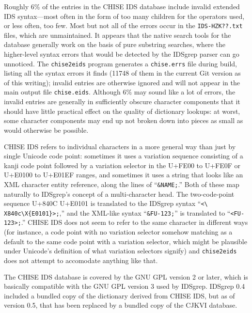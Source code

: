 \documentclass[twocolumn]{report}
\begin{document}
Roughly 6\% of the entries in the CHISE IDS database include invalid
extended IDS syntax---most often in the form of too many children for the
operators used, or less often, too few.  Most but not all of the errors
occur in the \texttt{IDS-HZK??.txt} files, which are unmaintained.  It
appears that the native search tools for the database generally work on the
basis of pure substring searches, where the higher-level syntax errors that
would be detected by the IDSgrep parser can go unnoticed.  The
\texttt{chise2eids} program generates a \texttt{chise.errs} file during
build, listing all the syntax errors it finds (11748 of them in the current
Git version as of this writing); invalid entries are otherwise ignored and
will not appear in the main output file \texttt{chise.eids}.  Although 6\%
may sound like a lot of errors, the invalid entries are generally in
sufficiently obscure character components that it should have little
practical effect on the quality of dictionary lookups: at worst, some
character components may end up not broken down into pieces as small as
would otherwise be possible.

CHISE IDS refers to individual characters in a more general way than just by
single Unicode code point: sometimes it uses a variation sequence consisting
of a kanji code point followed by a variation selector in the U+FE00 to
U+FE0F or U+E0100 to U+E01EF ranges, and sometimes it uses a string that
looks like an XML character entity reference, along the lines of
``\texttt{\&NAME;}.'' Both of these map naturally to IDSgrep's concept of a
multi-character head.  The two-code-point sequence U+840C U+E0101 is
translated to the IDSgrep syntax ``\texttt{<\textbackslash%
X840c\textbackslash X\{E0101\}>;},'' and the XML-like syntax
``\texttt{\&FU-123;}'' is translated to ``\texttt{<FU-123>;}.'' CHISE IDS
does not seem to refer to the same character in different ways (for
instance, a code point with no variation selector somehow matching as a
default to the same code point with a variation selector, which might be
plausible under Unicode's definition of what variation selectors signify)
and \texttt{chise2eids} does not attempt to accomodate anything like that.

The CHISE IDS database is covered by the GNU GPL version 2 or later, which
is basically compatible with the GNU GPL version 3 used by IDSgrep.  IDSgrep
0.4 included a bundled copy of the dictionary derived from CHISE IDS, but as
of version 0.5, that has been replaced by a bundled copy of the CJKVI
database.
\end{document}
